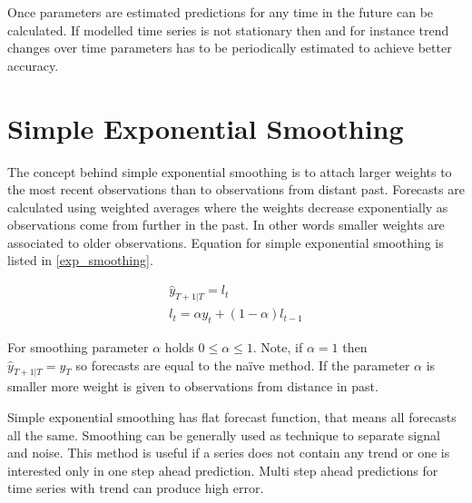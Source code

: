     Once parameters are estimated predictions for any time in the future can be calculated. 
    If modelled time series is not stationary then and for instance trend changes over
    time parameters has to be periodically estimated to achieve better accuracy. 

    \section{Simple Exponential Smoothing}
    The concept behind simple exponential smoothing is to attach 
    larger weights to the most recent observations than to observations from distant
    past. Forecasts are calculated using weighted averages where the weights 
    decrease exponentially as observations come from further in the past.
    In other words smaller weights are associated to older observations.
    Equation for simple exponential smoothing is listed in \ref{exp_smoothing}.

    \begin{eqnarray} \label{exp_smoothing}
         \hat{y}_{T+1|T} = l_t \\ \nonumber
         l_t = \alpha y_t + (1-\alpha)l_{t-1}
    \end{eqnarray}

    For smoothing parameter $\alpha$ holds $ 0 \leq \alpha \leq 1 $. Note, if $\alpha = 1$ then \\
    $\hat{y}_{T+1|T} = y_{T}$ so forecasts are equal to the na\"{i}ve method.
    If the parameter $\alpha $ is smaller more weight is given to observations from distance
    in past. 

    Simple exponential smoothing has flat forecast function, that means all forecasts
    all the same. Smoothing can be generally used as technique to separate signal and noise.
    This method is useful if a series does not contain any trend or one is interested only
    in one step ahead prediction. Multi step ahead predictions for time series with trend
    can produce high error.

